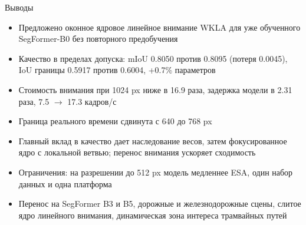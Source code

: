 \documentclass[aspectratio=169,xcolor=table]{beamer}
\begin{document}
\begin{frame}{Выводы}
  \small
  \begin{itemize}
    \item Предложено оконное ядровое линейное внимание WKLA для уже обученного SegFormer-B0 без повторного предобучения
    \item Качество в пределах допуска: mIoU 0.8050 против 0.8095 (потеря 0.0045), IoU границы 0.5917 против 0.6004, +0.7\% параметров
    \item Стоимость внимания при 1024 px ниже в 16.9 раза, задержка модели в 2.31 раза, 7.5 $\to$ 17.3 кадров/с
    \item Граница реального времени сдвинута с 640 до 768 px
    \item Главный вклад в качество дает наследование весов, затем фокусированное ядро с локальной ветвью; перенос внимания ускоряет сходимость
    \item Ограничения: на разрешении до 512 px модель медленнее ESA, один набор данных и одна платформа
    \item Перенос на SegFormer B3 и B5, дорожные и железнодорожные сцены, слитое ядро линейного внимания, динамическая зона интереса трамвайных путей~\cite{myarticle}
  \end{itemize}
\end{frame}
\end{document}
